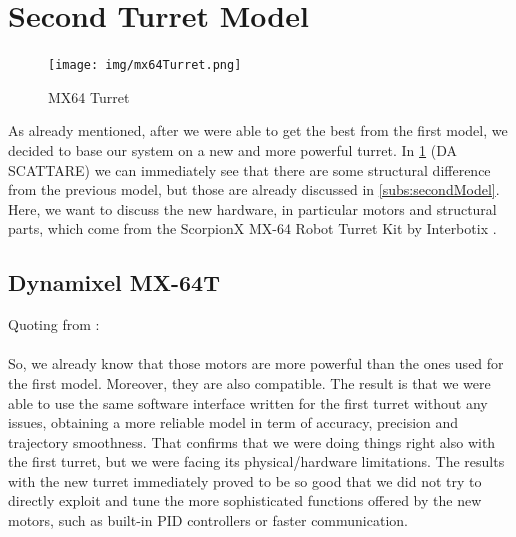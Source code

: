 \section{Second Turret Model}\label{sec:turret64}
\begin{figure}
	\centering
	\texttt{[image: img/mx64Turret.png]}%
	\caption{MX64 Turret}
	\label{fig:mx64Turret}
\end{figure}
As already mentioned, after we were able to get the best from the first model, we decided to base our system on a new and more powerful turret. In \ref{fig:mx64Turret} (DA SCATTARE) we can immediately see that there are some structural difference from the previous model, but those are already discussed in \ref{subs:secondModel}. Here, we want to discuss the new hardware, in particular motors and structural parts, which come from the ScorpionX MX-64 Robot Turret Kit by Interbotix \cite{MX64Turret}.
\subsection{Dynamixel MX-64T}
Quoting from \cite{web-MX64}:\\
\\
So, we already know that those motors are more powerful than the ones used for the first model. Moreover, they are also compatible. The result is that we were able to use the same software interface written for the first turret without any issues, obtaining a more reliable model in term of accuracy, precision and trajectory smoothness. That confirms that we were doing things right also with the first turret, but we were facing its physical/hardware limitations. The results with the new turret immediately proved to be so good that we did not try to directly exploit and tune the more sophisticated functions offered by the new motors, such as built-in PID controllers or faster communication.
